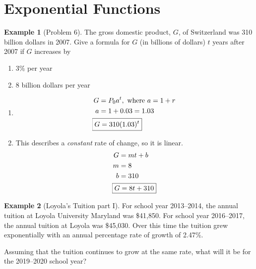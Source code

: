 \documentclass[oneside]{book}
\theoremstyle{definition}
\newtheorem{example}{Example}
\theoremstyle{solution}
\newtheorem*{solution}{Solution}
\newenvironment{solution}{\vspace{2in}\comment}{\endcomment}
\begin{document}
\section{Exponential Functions}

\begin{example}[Problem 6]
  The gross domestic product, $G$, of Switzerland was 310 billion
  dollars in 2007. Give a formula for $G$ (in billions of dollars)
  $t$ years after 2007 if $G$ increases by
\begin{enumerate}
\item   3\% per year
\item 8 billion dollars per year
\end{enumerate}
\end{example}

\begin{solution}
  \begin{enumerate}
  \item 
\begin{align*}
G & = P_0 a^t,\ \text{where }a=1+r\\
 a &= 1 + 0.03 = 1.03 \\
& \kern-1em \boxed{G = 310(1.03)^t}
\end{align*}

\item This describes a \emph{constant} rate of change, so it is
  linear.
\begin{align*}
G & = mt+b\\
m &= 8\\
b &= 310\\
&\kern-1em \boxed{G = 8t + 310}
\end{align*}
\end{enumerate}
\end{solution}


\begin{example}[Loyola's Tuition part I]
  For school year 2013--2014, the annual tuition at Loyola University
  Maryland was \$41,850.  For school year 2016--2017, the annual
  tuition at Loyola was \$45,030.   Over this time the
  tuition grew exponentially with an annual percentage rate of growth
  of 2.47\%.
\bigskip

  Assuming that the tuition continues to grow at the same rate, what
  will it be for the 2019--2020 school year?
\end{example}
\end{document}
